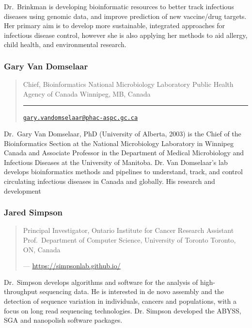 \documentclass[
]{book}
\begin{document}
Dr.~Brinkman is developing bioinformatic resources to better track
infectious diseases using genomic data, and improve prediction of new
vaccine/drug targets. Her primary aim is to develop more sustainable,
integrated approaches for infectious disease control, however she is
also applying her methods to aid allergy, child health, and
environmental research.

\subsubsection{Gary Van Domselaar}\label{gary-van-domselaar}

\begin{quote}
Chief, Bioinformatics National Microbiology Laboratory Public
Health Agency of Canada Winnipeg, MB, Canada

\begin{center}\rule{0.5\linewidth}{0.5pt}\end{center}

\href{mailto:gary.vandomselaar@phac-aspc.gc.ca}{\nolinkurl{gary.vandomselaar@phac-aspc.gc.ca}}
\end{quote}

Dr.~Gary Van Domselaar, PhD (University of Alberta, 2003) is the Chief
of the Bioinformatics Section at the National Microbiology Laboratory in
Winnipeg Canada and Associate Professor in the Department of Medical
Microbiology and Infectious Diseases at the University of Manitoba. Dr.
Van Domselaar's lab develops bioinformatics methods and pipelines to
understand, track, and control circulating infectious diseases in Canada
and globally. His research and development

\subsubsection{Jared Simpson}\label{jared-simpson}

\begin{quote}
Principal Investigator, Ontario Institute for Cancer Research
Assistant Prof.~Department of Computer Science, University of Toronto
Toronto, ON, Canada

--- \url{https://simpsonlab.github.io/}
\end{quote}

Dr.~Simpson develops algorithms and software for the analysis of
high-throughput sequencing data. He is interested in de novo assembly
and the detection of sequence variation in individuals, cancers and
populations, with a focus on long read sequencing technologies. Dr.
Simpson developed the ABYSS, SGA and nanopolish software packages.
\end{document}

